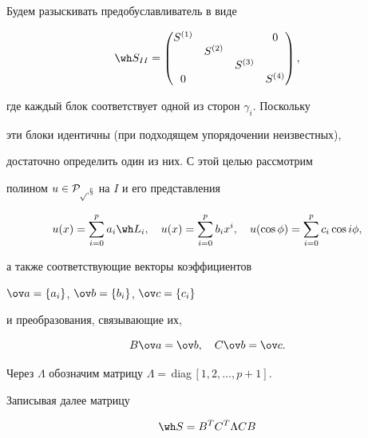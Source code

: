 Будем разыскивать предобуславливатель в виде


$$


\wh S_{II}=


\begin{pmatrix}


S^{(1)} &&&0 \\


& S^{(2)} \\


&& S^{(3)} \\


0 &&& S^{(4)} \\


\end{pmatrix},


$$


где каждый блок соответствует одной из сторон $\gamma_i$. Поскольку


эти блоки идентичны (при подходящем упорядочении неизвестных),


достаточно определить один из них. С этой целью рассмотрим


полином $u\in\cal P_{p,x}$ на $I$ и его представления


\begin{equation}


u(x)=\sum_{i=0}^p a_i\wh L_i,\quad


u(x)=\sum_{i=0}^p b_i x^i,\quad


u(\cos\phi)=\sum_{i=0}^p c_i\cos i\phi,


\label{3.4}


\end{equation}


а также соответствующие векторы коэффициентов


$\ov a=\{a_i\}$, $\ov b=\{b_i\}$, $\ov c=\{c_i\}$


и преобразования, связывающие их,


\begin{equation}


B\ov a=\ov b,\ \ \ C\ov b=\ov c.


\label{3.5}


\end{equation}


Через $\Lambda$ обозначим матрицу $\Lambda=\,$diag\,$[1,2,\dotsc,p+1]$.


Записывая далее матрицу


\begin{equation}


\wh S=B^TC^T\Lambda CB


\label{3.6}


\end{equation}


